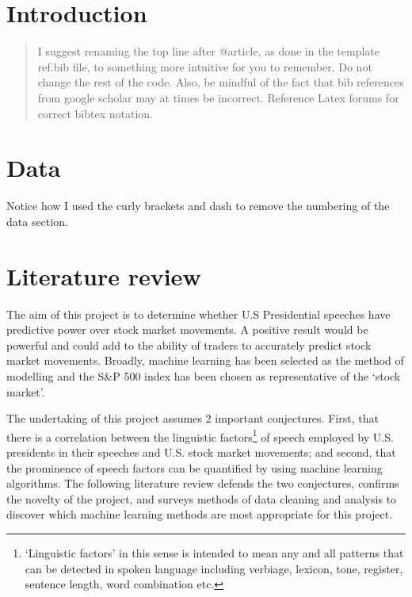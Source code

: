 \documentclass[11pt,preprint, authoryear]{elsarticle}
\numberwithin{equation}{section}
\numberwithin{figure}{section}
\numberwithin{table}{section}
\let\rmarkdownfootnote\footnote%
\def\footnote{\protect\rmarkdownfootnote}
\begin{document}

\headsep 35pt %




\newpage

\hypertarget{introduction}{%
\section{\texorpdfstring{Introduction
\label{Introduction}}{Introduction }}\label{introduction}}

\begin{quote}
I suggest renaming the top line after @article, as done in the template
ref.bib file, to something more intuitive for you to remember. Do not
change the rest of the code. Also, be mindful of the fact that bib
references from google scholar may at times be incorrect. Reference
Latex forums for correct bibtex notation.
\end{quote}

\hypertarget{data}{%
\section*{Data}\label{data}}

Notice how I used the curly brackets and dash to remove the numbering of
the data section.

\hypertarget{literature-review}{%
\section{\texorpdfstring{Literature review
\label{Literature review}}{Literature review }}\label{literature-review}}

The aim of this project is to determine whether U.S Presidential
speeches have predictive power over stock market movements. A positive
result would be powerful and could add to the ability of traders to
accurately predict stock market movements. Broadly, machine learning has
been selected as the method of modelling and the S\&P 500 index has been
chosen as representative of the `stock market'.

The undertaking of this project assumes 2 important conjectures. First,
that there is a correlation between the linguistic factors\footnote{`Linguistic
  factors' in this sense is intended to mean any and all patterns that
  can be detected in spoken language including verbiage, lexicon, tone,
  register, sentence length, word combination etc.} of speech employed
by U.S. presidents in their speeches and U.S. stock market movements;
and second, that the prominence of speech factors can be quantified by
using machine learning algorithms. The following literature review
defends the two conjectures, confirms the novelty of the project, and
surveys methods of data cleaning and analysis to discover which machine
learning methods are most appropriate for this project.
\end{document}
